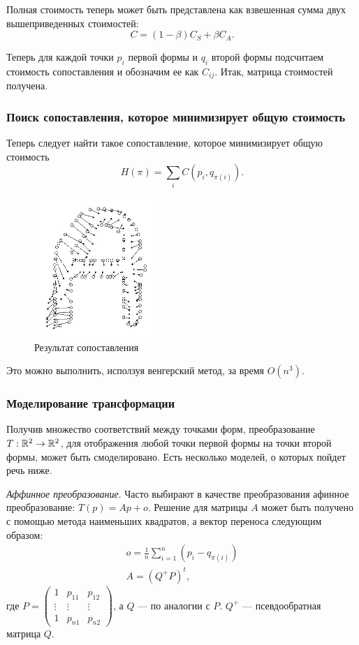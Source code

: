 Полная стоимость теперь может быть представлена как взвешенная сумма двух вышеприведенных стоимостей:
\begin{displaymath}
  C = (1 - \beta)C_S + \beta C_A.
\end{displaymath}

Теперь для каждой точки $p_i$ первой формы и $q_i$ второй формы подсчитаем стоимость сопоставления и обозначим ее как $C_{ij}$. Итак, матрица стоимостей получена.

\subsubsection{Поиск сопоставления, которое минимизирует общую стоимость}
Теперь следует найти такое сопоставление, которое минимизирует общую стоимость
\begin{displaymath}
  H(\pi) = \sum_i{C(p_i, q_{\pi(i)})}.
\end{displaymath}

\begin{figure}
  \centering
  \includegraphics[width=0.4\textwidth]{images/shape-context-matching.png}
  \caption{Результат сопоставления\label{shape-context-matching}}
\end{figure}

Это можно выполнить, исползуя венгерский метод, за время $O(n^3)$.

\subsubsection{Моделирование трансформации}
Получив множество соответствий между точками форм, преобразование $T : \Bbb{R}^2 \to \Bbb{R}^2$, для отображения любой точки первой формы на точки второй формы, может быть смоделировано. Есть несколько моделей, о которых пойдет речь ниже.

\emph{Аффинное преобразование}. Часто выбирают в качестве преобразования афинное преобразование: $T(p) = Ap + o$. Решение для матрицы $A$ может быть получено с помощью метода наименьших квадратов, а вектор переноса следующим образом:
\begin{gather*}
  o = \frac{1}{n}\sum_{i=1}^n \left (p_i - q_{\pi(i)} \right )\\
  A = (Q^+ P)^t,
\end{gather*}
где $P = \begin{pmatrix}
  1 & p_{11} & p_{12} \\
  \vdots & \vdots & \vdots \\
  1 & p_{n1} & p_{n2}
  \end{pmatrix}$, а $Q$ --- по аналогии с $P$. $Q^+$ --- псевдообратная матрица $Q$.

